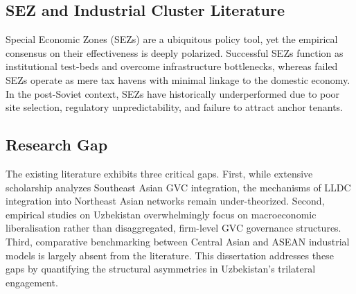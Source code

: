 \subsection{SEZ and Industrial Cluster Literature}
Special Economic Zones (SEZs) are a ubiquitous policy tool, yet the empirical consensus on their effectiveness is deeply polarized. Successful SEZs function as institutional test-beds and overcome infrastructure bottlenecks, whereas failed SEZs operate as mere tax havens with minimal linkage to the domestic economy. In the post-Soviet context, SEZs have historically underperformed due to poor site selection, regulatory unpredictability, and failure to attract anchor tenants.

\subsection{Research Gap}
The existing literature exhibits three critical gaps. First, while extensive scholarship analyzes Southeast Asian GVC integration, the mechanisms of LLDC integration into Northeast Asian networks remain under-theorized. Second, empirical studies on Uzbekistan overwhelmingly focus on macroeconomic liberalisation rather than disaggregated, firm-level GVC governance structures. Third, comparative benchmarking between Central Asian and ASEAN industrial models is largely absent from the literature. This dissertation addresses these gaps by quantifying the structural asymmetries in Uzbekistan's trilateral engagement.

